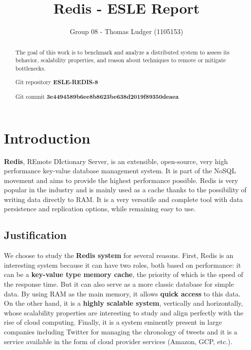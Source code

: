 \documentclass[runningheads]{llncs}
\begin{document}
\title{Redis - ESLE Report}
\author{Group 08 - Thomas Ludger (1105153)}
\maketitle
\begin{abstract}
The goal of this work is to benchmark and analyze a distributed system to assess its behavior, scalability properties, and reason about techniques to remove or mitigate bottlenecks.

Git repository \textbf{ESLE-REDIS-8}

Git commit \textbf{3e4494589b6ee8b8623be638d2019f89350deaea}

\end{abstract}

\section{Introduction}
\textbf{Redis}, REmote DIctionary Server, is an extensible, open-source, very high performance key-value database management system. It is part of the NoSQL movement and aims to provide the highest performance possible. Redis is very popular in the industry and is mainly used as a cache thanks to the possibility of writing data directly to RAM. It is a very versatile and complete tool with data persistence and replication options, while remaining easy to use.

\subsection{Justification}
We choose to study the \textbf{Redis system} for several reasons. First, Redis is an interesting system because it can have two roles, both based on performance: it can be a \textbf{key-value type memory cache}, the priority of which is the speed of the response time. But it can also serve as a more classic database for simple data. By using RAM as the main memory, it allows \textbf{quick access} to this data.
On the other hand, it is a \textbf{highly scalable system}, vertically and horizontally, whose scalability properties are interesting to study and align perfectly with the rise of cloud computing.
Finally, it is a system eminently present in large companies including Twitter for managing the chronology of tweets and it is a service available in the form of cloud provider services (Amazon, GCP, etc.).
\end{document}
